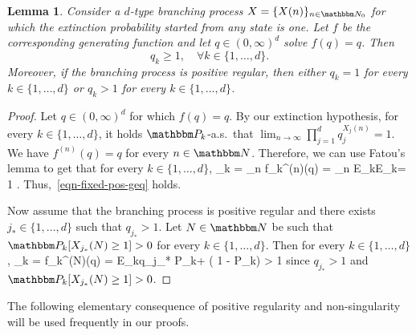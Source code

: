 \documentclass[11pt]{article}
\theoremstyle{plain}
\newtheorem{lem}[thm]{Lemma}
\theoremstyle{definition}
\numberwithin{equation}{section}
\def\alb#1\ale{\begin{align*}#1\end{align*}}
\newcommand{\eqb}{\begin{equation}}
\newcommand{\eqe}{\end{equation}}
\newcommand{\BB}{\mathbbm}
\let\originalleft\left
\let\originalright\right
\renewcommand{\left}{\mathopen{}\mathclose\bgroup\originalleft}
\renewcommand{\right}{\aftergroup\egroup\originalright}
\begin{document}
\begin{lem} \label{lem-fixed-pos}
Consider a $d$-type branching process $X = \{X(n)\}_{n\in\BB N_0}$ for which the extinction probability started from any state is one. Let $f$ be the corresponding generating function and let $q \in (0,\infty)^d$ solve $f(q) = q$. Then   
\eqb \label{eqn-fixed-pos-geq}
q_k \geq 1, \quad \forall k \in \{1, \dots, d\}  .
\eqe 
Moreover, if the branching process is positive regular, then either $q_k = 1$ for every $k\in \{1,\dots,d\}$ or $q_k > 1$ for every $k \in \{1,\dots,d\}$.
\end{lem}
\begin{proof} 
Let $q \in (0,\infty)^d$ for which $f(q) = q$. 
By our extinction hypothesis, for every $k \in   \{1,\dots,d\}$, it holds $\BB P_k$-a.s.\ that  $\lim_{n\to\infty} \prod_{j=1}^d q_j^{X_j(n)} = 1$. 
We have $f^{(n)}(q) = q$ for every $n\in\BB N$. 
Therefore, we can use Fatou's lemma to get that for every $k \in \{1,\dots,d\}$, 
\alb
q_k 
= \lim_{n\to\infty} f_k^{(n)}(q) 
= \lim_{n\to\infty} \BB E_k\left[ \prod_{j=1}^d  q_j^{X_j(n)} \right] 
\geq \BB E_k\left[ \lim_{n\to\infty} \prod_{j=1}^d  q_j^{X_j(n)} \right] 
= 1 .
\ale
Thus,~\eqref{eqn-fixed-pos-geq} holds. 

Now assume that the branching process is positive regular and there exists $j_* \in \{1,\dots,d\}$ such that $q_{j_*} > 1$.  
Let $N\in\BB N$ be such that $\BB P_k[X_{j_*}(N) \geq 1 ] > 0$ for every $k\in \{1,\dots,d\}$. 
Then for every $k\in \{1,\dots,d\}$, 
\alb
q_k 
= f_k^{(N)}(q) 
= \BB E_k\left[ \prod_{j=1}^d  q_j^{X_j(N)} \right] 
\geq q_{j_*} \BB P_k\left[ X_{j_*}(N) \geq 1 \right] + \left( 1 - \BB P_k\left[ X_{j_*}(N) \geq 1 \right] \right)  
 > 1 
\ale
since $q_{j_*} > 1$ and $ \BB P_k\left[ X_{j_*}(N) \geq 1 \right] > 0$.
\end{proof}

The following elementary consequence of positive regularity and non-singularity will be used frequently in our proofs. 
\end{document}
